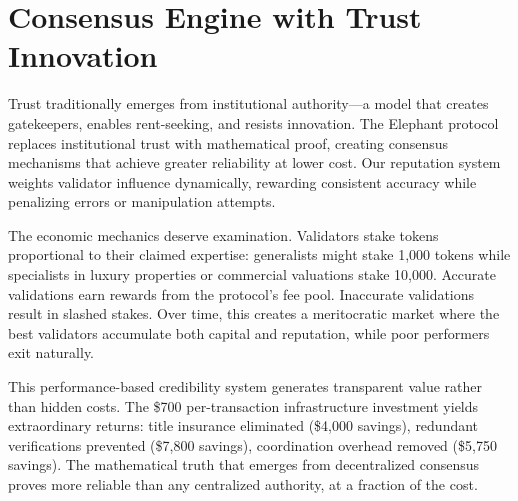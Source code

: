 \section{Consensus Engine with Trust Innovation}

Trust traditionally emerges from institutional authority—a model that creates gatekeepers, enables rent-seeking, and resists innovation. The Elephant protocol replaces institutional trust with mathematical proof, creating consensus mechanisms that achieve greater reliability at lower cost. Our reputation system weights validator influence dynamically, rewarding consistent accuracy while penalizing errors or manipulation attempts.

The economic mechanics deserve examination. Validators stake tokens proportional to their claimed expertise: generalists might stake 1{,}000 tokens while specialists in luxury properties or commercial valuations stake 10{,}000. Accurate validations earn rewards from the protocol's fee pool. Inaccurate validations result in slashed stakes. Over time, this creates a meritocratic market where the best validators accumulate both capital and reputation, while poor performers exit naturally.

This performance-based credibility system generates transparent value rather than hidden costs. The \$700 per-transaction infrastructure investment yields extraordinary returns: title insurance eliminated (\$4{,}000 savings), redundant verifications prevented (\$7{,}800 savings), coordination overhead removed (\$5{,}750 savings). The mathematical truth that emerges from decentralized consensus proves more reliable than any centralized authority, at a fraction of the cost.

